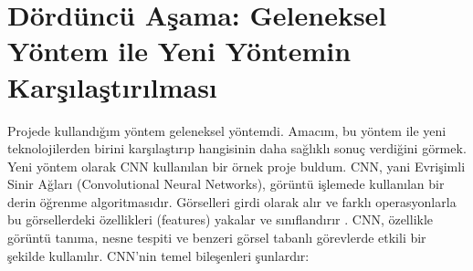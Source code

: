 \documentclass[12pt, a4paper]{article}
\begin{document}
 \section{ Dördüncü Aşama: Geleneksel Yöntem ile Yeni Yöntemin Karşılaştırılması} 
 Projede kullandığım yöntem geleneksel yöntemdi. Amacım, bu yöntem ile yeni teknolojilerden birini karşılaştırıp hangisinin daha sağlıklı sonuç verdiğini görmek.
 Yeni yöntem olarak CNN kullanılan bir örnek proje \cite{superthinking} buldum.
 CNN, yani Evrişimli Sinir Ağları (Convolutional Neural Networks), görüntü işlemede kullanılan bir derin öğrenme algoritmasıdır. Görselleri girdi olarak alır ve farklı operasyonlarla bu görsellerdeki özellikleri (features) yakalar ve sınıflandırır \cite{cnnnedir}. CNN, özellikle görüntü tanıma, nesne tespiti ve benzeri görsel tabanlı görevlerde etkili bir şekilde kullanılır.
 CNN’nin temel bileşenleri şunlardır:
 
\end{document}
